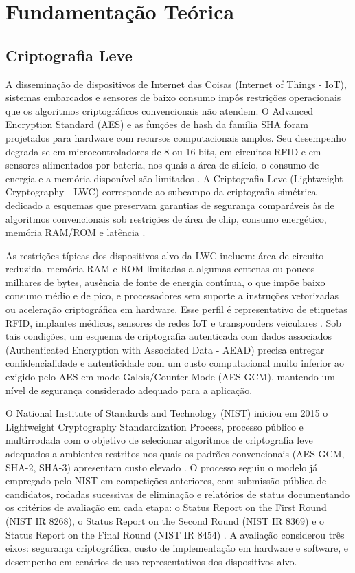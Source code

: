 \chapter{Fundamentação Teórica}
\noindent
\section{Criptografia Leve}

A disseminação de dispositivos de Internet das Coisas (Internet of Things - IoT), sistemas embarcados e sensores de baixo consumo impôs restrições operacionais que os algoritmos criptográficos convencionais não atendem. O Advanced Encryption Standard (AES) e as funções de hash da família SHA foram projetados para hardware com recursos computacionais amplos. Seu desempenho degrada-se em microcontroladores de 8 ou 16 bits, em circuitos RFID e em sensores alimentados por bateria, nos quais a área de silício, o consumo de energia e a memória disponível são limitados \cite{nist_sp800232_2025}.
A Criptografia Leve (Lightweight Cryptography - LWC) corresponde ao subcampo da criptografia simétrica dedicado a esquemas que preservam garantias de segurança comparáveis às de algoritmos convencionais sob restrições de área de chip, consumo energético, memória RAM/ROM e latência \cite{nist_sp800232_2025}.

As restrições típicas dos dispositivos-alvo da LWC incluem: área de circuito reduzida, memória RAM e ROM limitadas a algumas centenas ou poucos milhares de bytes, ausência de fonte de energia contínua, o que impõe baixo consumo médio e de pico, e processadores sem suporte a instruções vetorizadas ou aceleração criptográfica em hardware. Esse perfil é representativo de etiquetas RFID, implantes médicos, sensores de redes IoT e transponders veiculares \cite{nist_sp800232_2025}.
Sob tais condições, um esquema de criptografia autenticada com dados associados (Authenticated Encryption with Associated Data - AEAD) precisa entregar confidencialidade e autenticidade com um custo computacional muito inferior ao exigido pelo AES em modo Galois/Counter Mode (AES-GCM), mantendo um nível de segurança considerado adequado para a aplicação.

O National Institute of Standards and Technology (NIST) iniciou em 2015 o Lightweight Cryptography Standardization Process, processo público e multirrodada com o objetivo de selecionar algoritmos de criptografia leve adequados a ambientes restritos nos quais os padrões convencionais (AES-GCM, SHA-2, SHA-3) apresentam custo elevado \cite{nist_sp800232_2025}.
O processo seguiu o modelo já empregado pelo NIST em competições anteriores, com submissão pública de candidatos, rodadas sucessivas de eliminação e relatórios de status documentando os critérios de avaliação em cada etapa: o Status Report on the First Round (NIST IR 8268), o Status Report on the Second Round (NIST IR 8369) e o Status Report on the Final Round (NIST IR 8454) \cite{nist_sp800232_2025}. A avaliação considerou três eixos: segurança criptográfica, custo de implementação em hardware e software, e desempenho em cenários de uso representativos dos dispositivos-alvo.

